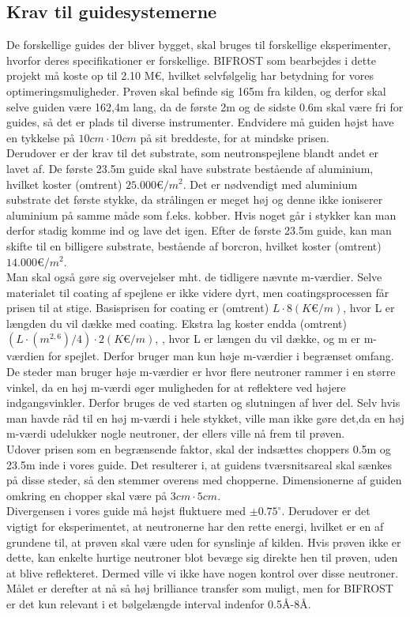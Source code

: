 \documentclass[12pt,oneside,a4paper]{article}
\begin{document}
{{{{{\subsection{Krav til guidesystemerne}
De forskellige guides der bliver bygget, skal bruges til forskellige eksperimenter, hvorfor deres specifikationer er forskellige. BIFROST som bearbejdes i dette projekt må koste op til 2.10 M€, hvilket selvfølgelig har betydning for vores optimeringsmuligheder. Prøven skal befinde sig 165m fra kilden, og derfor skal selve guiden være 162,4m lang, da de første 2m og de sidste 0.6m skal være fri for guides, så det er plads til diverse instrumenter. Endvidere må guiden højst have en tykkelse på $10cm \cdot 10cm$ på sit breddeste, for at mindske prisen.
\\
Derudover er der krav til det substrate, som neutronspejlene blandt andet er lavet af. De første 23.5m guide skal have substrate bestående af aluminium, hvilket koster (omtrent) $25.000 \text{€}/m^2$. Det er nødvendigt med aluminium substrate det første stykke, da strålingen er meget høj og denne ikke ioniserer aluminium på samme måde som f.eks. kobber. Hvis noget går i stykker kan man derfor stadig komme ind og lave det igen. Efter de første 23.5m guide, kan man skifte til en billigere substrate, bestående af borcron, hvilket koster (omtrent) $14.000 \text{€}/m^2$.
\\
Man skal også gøre sig overvejelser mht. de tidligere nævnte m-værdier. Selve materialet til coating af spejlene er ikke videre dyrt, men coatingsprocessen får prisen til at stige. Basisprisen for coating er (omtrent) $L\cdot8(K\text{€}/m)$, hvor L er længden du vil dække med coating. Ekstra lag koster endda (omtrent) $(L\cdot(m^{2,6})/4)\cdot2(K\text{€}/m)$, , hvor L er længen du vil dække, og m er m-værdien for spejlet. Derfor bruger man kun høje m-værdier i begrænset omfang. De steder man bruger høje m-værdier er hvor flere neutroner rammer i en større vinkel, da en høj m-værdi øger muligheden for at reflektere ved højere indgangsvinkler. Derfor bruges de ved starten og slutningen af hver del. Selv hvis man havde råd til en høj m-værdi i hele stykket, ville man ikke gøre det,da en høj m-værdi udelukker nogle neutroner, der ellers ville nå frem til prøven.
\\
Udover prisen som en begrænsende faktor, skal der indsættes choppers 0.5m og 23.5m inde i vores guide. Det resulterer i, at guidens tværsnitsareal skal sænkes på disse steder, så den stemmer overens med chopperne. Dimensionerne af guiden omkring en chopper skal være på $3cm\cdot5cm$. 
\\
Divergensen i vores guide må højst fluktuere med $\pm0.75^\circ$. Derudover er det vigtigt for eksperimentet, at neutronerne har den rette energi, hvilket er en af grundene til, at prøven skal være uden for synslinje af kilden. Hvis prøven ikke er dette, kan enkelte hurtige neutroner blot  bevæge sig direkte hen til prøven, uden at blive reflekteret. Dermed ville vi ikke have nogen kontrol over disse neutroner.
\\
Målet er derefter at nå så høj brilliance transfer som muligt, men for BIFROST er det kun relevant i et bølgelængde interval indenfor 0.5Å-8Å.

}}}}}
\end{document}
